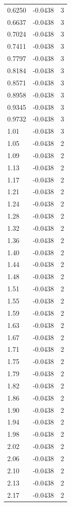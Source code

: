 \begin{longtable}{lrr}
  0.6250 & -0.0438 & 3 \\
  0.6637 & -0.0438 & 3 \\
  0.7024 & -0.0438 & 3 \\
  0.7411 & -0.0438 & 3 \\
  0.7797 & -0.0438 & 3 \\
  0.8184 & -0.0438 & 3 \\
  0.8571 & -0.0438 & 3 \\
  0.8958 & -0.0438 & 3 \\
  0.9345 & -0.0438 & 3 \\
  0.9732 & -0.0438 & 3 \\
  1.01 & -0.0438 & 3 \\
  1.05 & -0.0438 & 2 \\
  1.09 & -0.0438 & 2 \\
  1.13 & -0.0438 & 2 \\
  1.17 & -0.0438 & 2 \\
  1.21 & -0.0438 & 2 \\
  1.24 & -0.0438 & 2 \\
  1.28 & -0.0438 & 2 \\
  1.32 & -0.0438 & 2 \\
  1.36 & -0.0438 & 2 \\
  1.40 & -0.0438 & 2 \\
  1.44 & -0.0438 & 2 \\
  1.48 & -0.0438 & 2 \\
  1.51 & -0.0438 & 2 \\
  1.55 & -0.0438 & 2 \\
  1.59 & -0.0438 & 2 \\
  1.63 & -0.0438 & 2 \\
  1.67 & -0.0438 & 2 \\
  1.71 & -0.0438 & 2 \\
  1.75 & -0.0438 & 2 \\
  1.79 & -0.0438 & 2 \\
  1.82 & -0.0438 & 2 \\
  1.86 & -0.0438 & 2 \\
  1.90 & -0.0438 & 2 \\
  1.94 & -0.0438 & 2 \\
  1.98 & -0.0438 & 2 \\
  2.02 & -0.0438 & 2 \\
  2.06 & -0.0438 & 2 \\
  2.10 & -0.0438 & 2 \\
  2.13 & -0.0438 & 2 \\
  2.17 & -0.0438 & 2 \\

\end{longtable}
